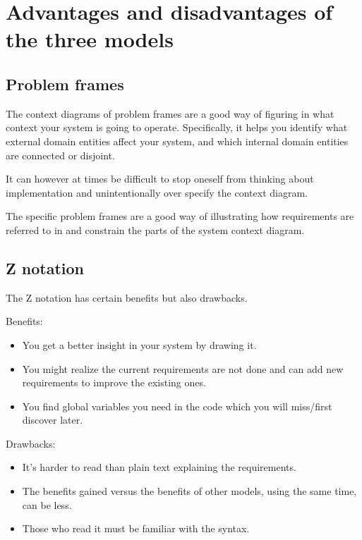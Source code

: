 \documentclass[Main_Assignment2]{subfiles}
\begin{document}
\section{Advantages and disadvantages of the three models}

	\subsection{Problem frames} %
	\label{sub:problem_frames}

	The context diagrams of problem frames are a good way of figuring in what context your system is going to operate.
	Specifically, it helps you identify what external domain entities affect your system, and which internal domain entities are connected or disjoint.

	It can however at times be difficult to stop oneself from thinking about implementation and unintentionally over specify the context diagram.

	The specific problem frames are a good way of illustrating how requirements are referred to in and constrain the parts of the system context diagram.



	\subsection{Z notation}
	The Z notation has certain benefits but also drawbacks.

	Benefits:
	\vspace{-10pt}
	\begin{itemize}
		\item You get a better insight in your system by drawing it.
		\item You might realize the current requirements are not done and can add new requirements to improve the existing ones.
		\item You find global variables you need in the code which you will miss/first discover later.
	\end{itemize}

	Drawbacks:
	\vspace{-10pt}
	\begin{itemize}
		\item It's harder to read than plain text explaining the requirements.
		\item The benefits gained versus the benefits of other models, using the same time, can be less.
		\item Those who read it must be familiar with the syntax.
	\end{itemize}
\end{document}
